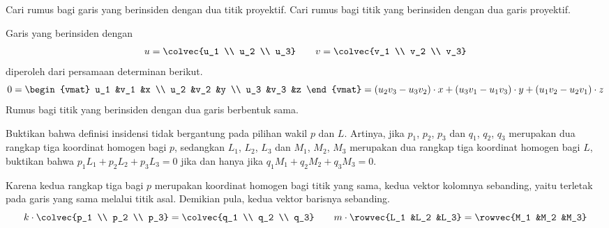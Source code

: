 \begin{exercises}
  \item
    Cari rumus bagi garis yang berinsiden dengan dua titik proyektif.
    Cari rumus bagi titik yang berinsiden dengan dua garis proyektif.
    \begin{answer}
      Garis yang berinsiden dengan
      \begin{equation*}
        u=\colvec{u_1 \\ u_2 \\ u_3}
        \qquad
        v=\colvec{v_1 \\ v_2 \\ v_3}
      \end{equation*}
      diperoleh dari persamaan determinan berikut.
      \begin{equation*}
        0=\begin{vmat}
          u_1  &v_1  &x  \\
          u_2  &v_2  &y  \\
          u_3  &v_3  &z
        \end{vmat}
        =(u_2v_3-u_3v_2)\cdot x 
          + (u_3v_1-u_1v_3)\cdot y 
          + (u_1v_2-u_2v_1)\cdot z
      \end{equation*}
      Rumus bagi titik yang berinsiden dengan dua garis berbentuk sama.
    \end{answer}
  \item \label{exer:IncidentIndReps}
    Buktikan bahwa definisi insidensi tidak bergantung pada pilihan wakil $p$
    dan $L$.
    Artinya, jika $p_1$, $p_2$, $p_3$ dan $q_1$, $q_2$, $q_3$ merupakan dua
    rangkap tiga koordinat homogen bagi $p$, sedangkan $L_1$, $L_2$, $L_3$ dan
    $M_1$, $M_2$, $M_3$ merupakan dua rangkap tiga koordinat homogen bagi $L$,
    buktikan bahwa
    $p_1L_1+p_2L_2+p_3L_3=0$ jika dan hanya jika
    $q_1M_1+q_2M_2+q_3M_3=0$. 
    \begin{answer}
      Karena kedua rangkap tiga bagi $p$ merupakan koordinat homogen bagi titik
      yang sama, kedua vektor kolomnya sebanding, yaitu terletak pada garis yang
      sama melalui titik asal.
      Demikian pula, kedua vektor barisnya sebanding.
      \begin{equation*}
        k\cdot\colvec{p_1 \\ p_2 \\ p_3}
          =\colvec{q_1 \\ q_2 \\ q_3}
        \qquad
        m\cdot\rowvec{L_1 &L_2 &L_3}
          =\rowvec{M_1 &M_2 &M_3}
      \end{equation*}

\end{answer}
\end{exercises}

